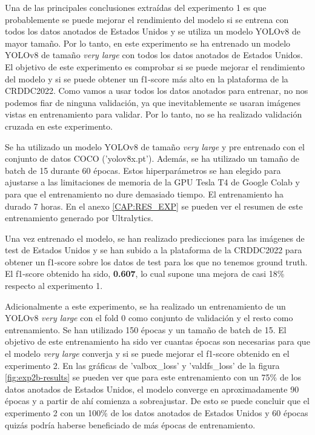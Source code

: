 Una de las principales conclusiones extraídas del experimento 1 es que probablemente se puede mejorar el rendimiento del modelo si se entrena con todos los datos anotados de Estados Unidos y se utiliza un modelo YOLOv8 de mayor tamaño. Por lo tanto, en este experimento se ha entrenado un modelo YOLOv8 de tamaño \textit{very large} con todos los datos anotados de Estados Unidos. El objetivo de este experimento es comprobar si se puede mejorar el rendimiento del modelo y si se puede obtener un f1-score más alto en la plataforma de la CRDDC2022. Como vamos a usar todos los datos anotados para entrenar, no nos podemos fiar de ninguna validación, ya que inevitablemente se usaran imágenes vistas en entrenamiento para validar. Por lo tanto, no se ha realizado validación cruzada en este experimento.

Se ha utilizado un modelo YOLOv8 de tamaño \textit{very large} y pre entrenado con el conjunto de datos COCO ('yolov8x.pt'). Además, se ha utilizado un tamaño de batch de 15 durante 60 épocas. Estos hiperparámetros se han elegido para ajustarse a las limitaciones de memoria de la GPU Tesla T4 de Google Colab y para que el entrenamiento no dure demasiado tiempo. El entrenamiento ha durado 7 horas. En el anexo \ref{CAP:RES_EXP} se pueden ver el resumen de este entrenamiento generado por Ultralytics.

Una vez entrenado el modelo, se han realizado predicciones para las imágenes de test de Estados Unidos y se han subido a la plataforma de la CRDDC2022 para obtener un f1-score sobre los datos de test para los que no tenemos ground truth. El f1-score obtenido ha sido, \textbf{0.607}, lo cual supone una mejora de casi 18\% respecto al experimento 1.

Adicionalmente a este experimento, se ha realizado un entrenamiento de un YOLOv8 \textit{very large} con el fold 0 como conjunto de validación y el resto como entrenamiento. Se han utilizado 150 épocas y un tamaño de batch de 15. El objetivo de este entrenamiento ha sido ver cuantas épocas son necesarias para que el modelo \textit{very large} converja y si se puede mejorar el f1-score obtenido en el experimento 2. En las gráficas de 'val\/box\_loss' y 'val\/dfs\_loss' de la figura \ref{fig:exp2b-results} se pueden ver que para este entrenamiento con un 75\% de los datos anotados de Estados Unidos, el modelo converge en aproximadamente 90 épocas y a partir de ahí comienza a sobreajustar. De esto se puede concluir que el experimento 2 con un 100\% de los datos anotados de Estados Unidos y 60 épocas quizás podría haberse beneficiado de más épocas de entrenamiento.

